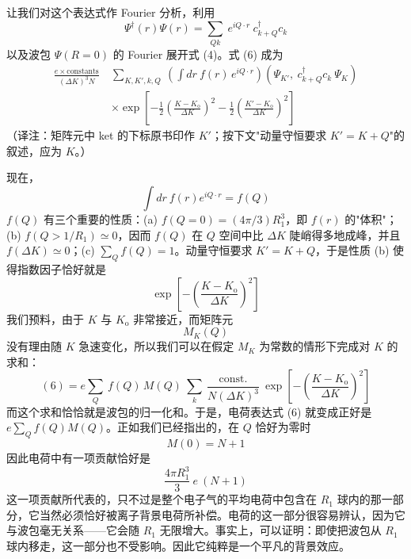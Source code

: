 让我们对这个表达式作 Fourier 分析，利用
\begin{equation*}
\Psi^{\dagger}(r)\Psi(r) = \sum_{Qk}\ e^{iQ\cdot r}\ c^{\dagger}_{k+Q}c_{k}
\end{equation*}
以及波包 $\Psi(R=0)$ 的 Fourier 展开式 (4)。式 (6) 成为
\begin{align*}
\frac{e\times\text{constants}}{(\Delta K)^{3}N}\ &\sum_{K,K',k,Q}\ \left(\int dr\ f(r)\,e^{iQ\cdot r}\right)\left(\Psi_{K'},\ c^{\dagger}_{k+Q}c_{k}\ \Psi_{K}\right)\\
&\times\exp\left[-\frac{1}{2}\left(\frac{K-K_{\mathrm{o}}}{\Delta K}\right)^{2}-\frac{1}{2}\left(\frac{K'-K_{\mathrm{o}}}{\Delta K}\right)^{2}\right]
\end{align*}
（译注：矩阵元中 ket 的下标原书印作 $K'$；按下文"动量守恒要求 $K'=K+Q$"的叙述，应为 $K$。）

现在，
\begin{equation*}
\int dr\ f(r)e^{iQ\cdot r} = f(Q)
\end{equation*}
$f(Q)$ 有三个重要的性质：(a) $f(Q=0)=(4\pi/3)R_{1}^{3}$，即 $f(r)$ 的"体积"；(b) $f(Q>1/R_{1})\simeq 0$，因而 $f(Q)$ 在 $Q$ 空间中比 $\Delta K$ 陡峭得多地成峰，并且 $f(\Delta K)\simeq 0$；(c) $\sum_{Q}f(Q)=1$。动量守恒要求 $K'=K+Q$，于是性质 (b) 使得指数因子恰好就是
\begin{equation*}
\exp\left[-\left(\frac{K-K_{\mathrm{o}}}{\Delta K}\right)^{2}\right]
\end{equation*}
我们预料，由于 $K$ 与 $K_{\mathrm{o}}$ 非常接近，而矩阵元
\begin{equation*}
M_{K}(Q)
\end{equation*}
没有理由随 $K$ 急速变化，所以我们可以在假定 $M_{K}$ 为常数的情形下完成对 $K$ 的求和：
\begin{equation*}
(6) = e\sum_{Q}\ f(Q)\,M(Q)\ \sum_{k}\ \frac{\text{const.}}{N(\Delta K)^{3}}\ \exp\left[-\left(\frac{K-K_{\mathrm{o}}}{\Delta K}\right)^{2}\right]
\end{equation*}
而这个求和恰恰就是波包的归一化和。于是，电荷表达式 (6) 就变成正好是 $e\sum_{Q}f(Q)M(Q)$。正如我们已经指出的，在 $Q$ 恰好为零时
\begin{equation*}
M(0) = N + 1
\end{equation*}
因此电荷中有一项贡献恰好是
\begin{equation*}
\frac{4\pi R_{1}^{3}}{3}\ e\ (N+1)
\end{equation*}
这一项贡献所代表的，只不过是整个电子气的平均电荷中包含在 $R_{1}$ 球内的那一部分，它当然必须恰好被离子背景电荷所补偿。电荷的这一部分很容易辨认，因为它与波包毫无关系——它会随 $R_{1}$ 无限增大。事实上，可以证明：即使把波包从 $R_{1}$ 球内移走，这一部分也不受影响。因此它纯粹是一个平凡的背景效应。

